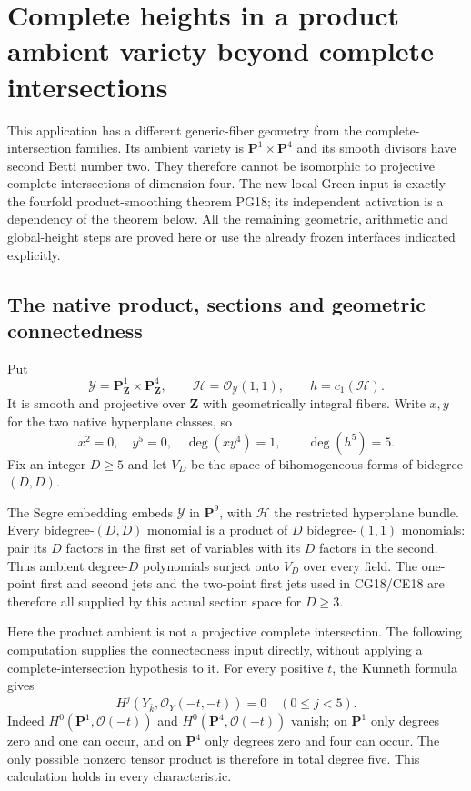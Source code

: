 \section{Complete heights in a product ambient variety beyond complete intersections}
\label{r18pa:section}

This application has a different generic-fiber geometry from the
complete-intersection families.  Its ambient variety is
$\mathbf P^1\times\mathbf P^4$ and its smooth divisors have
second Betti number two.  They therefore cannot be isomorphic to
projective complete intersections of dimension four.  The new
local Green input is exactly the fourfold product-smoothing
theorem PG18; its independent activation is a dependency of
the theorem below.  All the remaining geometric, arithmetic
and global-height steps are proved here or use the already
frozen interfaces indicated explicitly.

\subsection{The native product, sections and geometric connectedness}

Put
\[
 \mathcal Y=\mathbf P^1_{\mathbf Z}\times\mathbf P^4_{\mathbf Z},
 \qquad\mathcal H=\mathcal O_{\mathcal Y}(1,1),
 \qquad h=c_1(\mathcal H).
 \tag{PA18.1}\label{r18pa:ambient}
\]
It is smooth and projective over $\mathbf Z$ with geometrically
integral fibers.  Write $x,y$ for the two native hyperplane
classes, so
\[
 x^2=0,\quad y^5=0,\quad\deg(xy^4)=1,
                  \qquad\deg(h^5)=5.
 \tag{PA18.2}\label{r18pa:degree}
\]
Fix an integer $D\ge5$ and let $V_D$ be the space of
bihomogeneous forms of bidegree $(D,D)$.

The Segre embedding embeds $\mathcal Y$ in $\mathbf P^9$,
with $\mathcal H$ the restricted hyperplane bundle.
Every bidegree-$(D,D)$ monomial is a product of $D$
bidegree-$(1,1)$ monomials: pair its $D$ factors in
the first set of variables with its $D$ factors in
the second.  Thus ambient degree-$D$ polynomials
surject onto $V_D$ over every field.
The one-point first and second jets and the two-point
first jets used in CG18/CE18 are therefore all supplied
by this actual section space for $D\ge3$.

Here the product ambient is not a projective complete
intersection.  The following computation supplies
the connectedness input directly, without applying
a complete-intersection hypothesis to it.  For
every positive $t$, the Kunneth formula gives
\[
        H^j(Y_{\bar k},\mathcal O_Y(-t,-t))=0
                                      \quad(0\le j<5).
 \tag{PA18.3}\label{r18pa:negative-vanishing}
\]
Indeed $H^0(\mathbf P^1,\mathcal O(-t))$ and
$H^0(\mathbf P^4,\mathcal O(-t))$ vanish;
on $\mathbf P^1$ only degrees zero and one
can occur, and on $\mathbf P^4$ only degrees
zero and four can occur.  The only possible
nonzero tensor product is therefore in total
degree five.  This calculation holds in every
characteristic.


